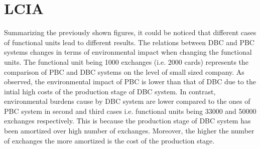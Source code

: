 \documentclass[conference]{IEEEtran}
\begin{document}

\section{LCIA}

Summarizing the previously shown figures, it could be noticed that different cases of functional units lead to different results. The relations between DBC and PBC systems changes in terms of environmental impact when changing the functional units. The functional unit being 1000 exchanges (i.e. 2000 cards) represents the comparison of PBC and DBC systems on the level of small sized company. As observed, the environmental impact of PBC is lower than that of DBC due to the intial high costs of the production stage of DBC system. In contrast, environmental burdens cause by DBC system are lower compared to the ones of PBC system in second and third cases i.e. functional units being 33000 and 50000 exchanges respectively. This is because the production stage of DBC system has been amortized over high number of exchanges. Moreover, the higher the number of exchanges the more amortized is the cost of the production stage.
\end{document}
